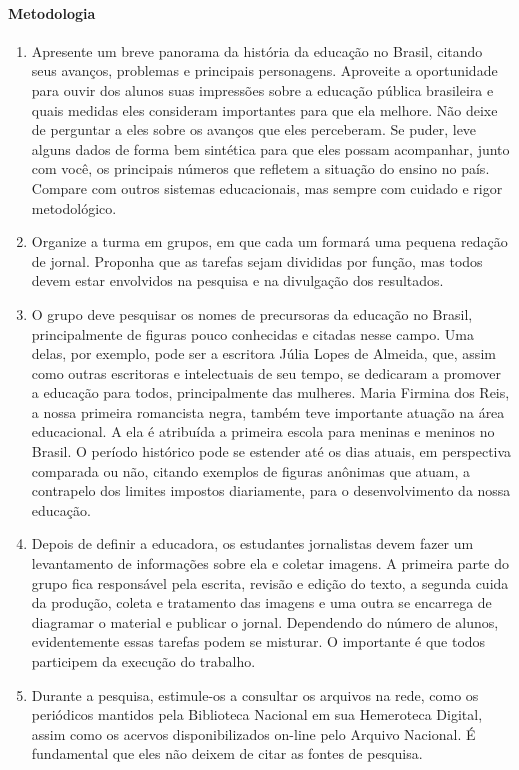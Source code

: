 \documentclass[12pt]{extarticle}
\begin{document}
\paragraph{Metodologia} 
\begin{enumerate}
\item
Apresente um breve panorama da história da
educação no Brasil, citando seus avanços, problemas e principais
personagens. Aproveite a oportunidade para ouvir dos alunos suas
impressões sobre a educação pública brasileira e quais medidas eles
consideram importantes para que ela melhore. Não deixe de perguntar a
eles sobre os avanços que eles perceberam. Se puder, leve alguns dados
de forma bem sintética para que eles possam acompanhar, junto com você,
os principais números que refletem a situação do ensino no país. Compare
com outros sistemas educacionais, mas sempre com cuidado e rigor
metodológico.

\item
Organize a turma em grupos, em que cada um formará uma pequena
redação de jornal. Proponha que as tarefas sejam divididas por função,
mas todos devem estar envolvidos na pesquisa e na divulgação dos
resultados.

\item
O grupo deve pesquisar os nomes de precursoras da educação no Brasil,
principalmente de figuras pouco conhecidas e citadas nesse campo. Uma
delas, por exemplo, pode ser a escritora Júlia Lopes de Almeida, que,
assim como outras escritoras e intelectuais de seu tempo, se dedicaram a
promover a educação para todos, principalmente das mulheres. Maria
Firmina dos Reis, a nossa primeira romancista negra, também teve
importante atuação na área educacional. A ela é atribuída a primeira
escola para meninas e meninos no Brasil. O período histórico pode se
estender até os dias atuais, em perspectiva comparada ou não, citando
exemplos de figuras anônimas que atuam, a contrapelo dos limites
impostos diariamente, para o desenvolvimento da nossa educação.

\item
Depois de definir a educadora, os estudantes jornalistas devem fazer
um levantamento de informações sobre ela e coletar imagens. A primeira
parte do grupo fica responsável pela escrita, revisão e edição do texto,
a segunda cuida da produção, coleta e tratamento das imagens e uma outra
se encarrega de diagramar o material e publicar o jornal. Dependendo do
número de alunos, evidentemente essas tarefas podem se misturar. O
importante é que todos participem da execução do trabalho.

\item
Durante a pesquisa, estimule-os a consultar os arquivos na rede, como
os periódicos mantidos pela Biblioteca Nacional em sua Hemeroteca
Digital, assim como os acervos disponibilizados on-line pelo Arquivo
Nacional. É fundamental que eles não deixem de citar as fontes de
pesquisa.
\end{enumerate}
\end{document}
